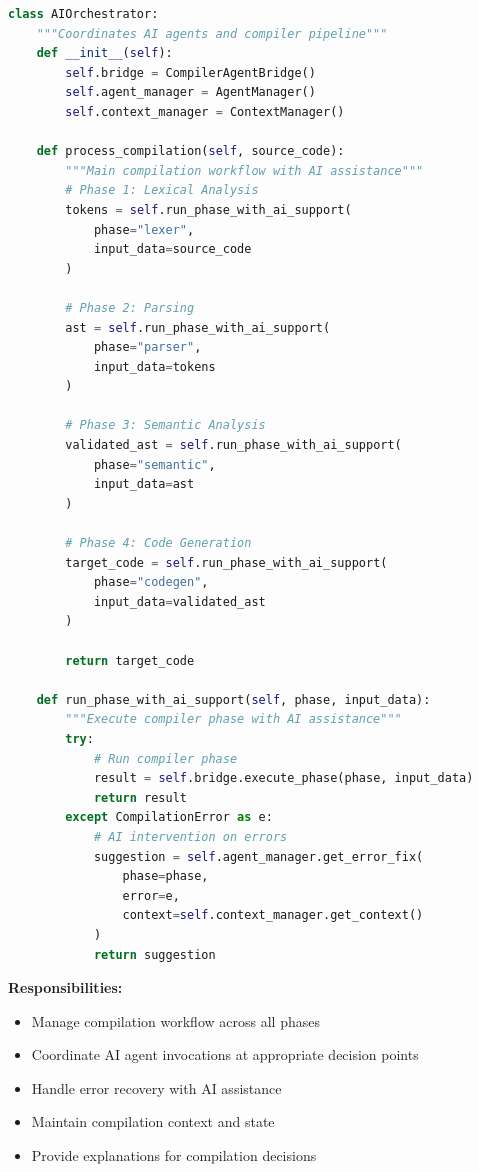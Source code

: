 \documentclass[a4paper,11pt]{article}
\begin{document}
\begin{lstlisting}[language=Python, caption=Orchestration Engine Structure]
class AIOrchestrator:
    """Coordinates AI agents and compiler pipeline"""
    def __init__(self):
        self.bridge = CompilerAgentBridge()
        self.agent_manager = AgentManager()
        self.context_manager = ContextManager()
    
    def process_compilation(self, source_code):
        """Main compilation workflow with AI assistance"""
        # Phase 1: Lexical Analysis
        tokens = self.run_phase_with_ai_support(
            phase="lexer",
            input_data=source_code
        )
        
        # Phase 2: Parsing
        ast = self.run_phase_with_ai_support(
            phase="parser",
            input_data=tokens
        )
        
        # Phase 3: Semantic Analysis
        validated_ast = self.run_phase_with_ai_support(
            phase="semantic",
            input_data=ast
        )
        
        # Phase 4: Code Generation
        target_code = self.run_phase_with_ai_support(
            phase="codegen",
            input_data=validated_ast
        )
        
        return target_code
    
    def run_phase_with_ai_support(self, phase, input_data):
        """Execute compiler phase with AI assistance"""
        try:
            # Run compiler phase
            result = self.bridge.execute_phase(phase, input_data)
            return result
        except CompilationError as e:
            # AI intervention on errors
            suggestion = self.agent_manager.get_error_fix(
                phase=phase,
                error=e,
                context=self.context_manager.get_context()
            )
            return suggestion
\end{lstlisting}

\textbf{Responsibilities:}
\begin{itemize}[leftmargin=*]
    \item Manage compilation workflow across all phases
    \item Coordinate AI agent invocations at appropriate decision points
    \item Handle error recovery with AI assistance
    \item Maintain compilation context and state
    \item Provide explanations for compilation decisions
\end{itemize}
\end{document}
